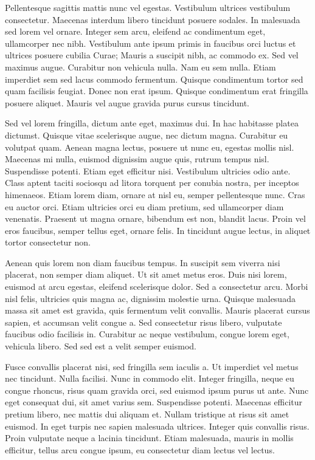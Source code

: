 \documentclass{article}
\begin{document}
	Pellentesque sagittis mattis nunc vel egestas. Vestibulum ultrices vestibulum consectetur. Maecenas interdum libero tincidunt posuere sodales. In malesuada sed lorem vel ornare. Integer sem arcu, eleifend ac condimentum eget, ullamcorper nec nibh. Vestibulum ante ipsum primis in faucibus orci luctus et ultrices posuere cubilia Curae; Mauris a suscipit nibh, ac commodo ex. Sed vel maximus augue. Curabitur non vehicula nulla. Nam eu sem nulla. Etiam imperdiet sem sed lacus commodo fermentum. Quisque condimentum tortor sed quam facilisis feugiat. Donec non erat ipsum. Quisque condimentum erat fringilla posuere aliquet. Mauris vel augue gravida purus cursus tincidunt.
	
	Sed vel lorem fringilla, dictum ante eget, maximus dui. In hac habitasse platea dictumst. Quisque vitae scelerisque augue, nec dictum magna. Curabitur eu volutpat quam. Aenean magna lectus, posuere ut nunc eu, egestas mollis nisl. Maecenas mi nulla, euismod dignissim augue quis, rutrum tempus nisl. Suspendisse potenti. Etiam eget efficitur nisi. Vestibulum ultricies odio ante. Class aptent taciti sociosqu ad litora torquent per conubia nostra, per inceptos himenaeos. Etiam lorem diam, ornare at nisl eu, semper pellentesque nunc. Cras eu auctor orci. Etiam ultricies orci eu diam pretium, sed ullamcorper diam venenatis. Praesent ut magna ornare, bibendum est non, blandit lacus. Proin vel eros faucibus, semper tellus eget, ornare felis. In tincidunt augue lectus, in aliquet tortor consectetur non.
	
	Aenean quis lorem non diam faucibus tempus. In suscipit sem viverra nisi placerat, non semper diam aliquet. Ut sit amet metus eros. Duis nisi lorem, euismod at arcu egestas, eleifend scelerisque dolor. Sed a consectetur arcu. Morbi nisl felis, ultricies quis magna ac, dignissim molestie urna. Quisque malesuada massa sit amet est gravida, quis fermentum velit convallis. Mauris placerat cursus sapien, et accumsan velit congue a. Sed consectetur risus libero, vulputate faucibus odio facilisis in. Curabitur ac neque vestibulum, congue lorem eget, vehicula libero. Sed sed est a velit semper euismod.
	
	Fusce convallis placerat nisi, sed fringilla sem iaculis a. Ut imperdiet vel metus nec tincidunt. Nulla facilisi. Nunc in commodo elit. Integer fringilla, neque eu congue rhoncus, risus quam gravida orci, sed euismod ipsum purus ut ante. Nunc eget consequat dui, sit amet varius sem. Suspendisse potenti. Maecenas efficitur pretium libero, nec mattis dui aliquam et. Nullam tristique at risus sit amet euismod. In eget turpis nec sapien malesuada ultrices. Integer quis convallis risus. Proin vulputate neque a lacinia tincidunt. Etiam malesuada, mauris in mollis efficitur, tellus arcu congue ipsum, eu consectetur diam lectus vel lectus.
	
\end{document}
